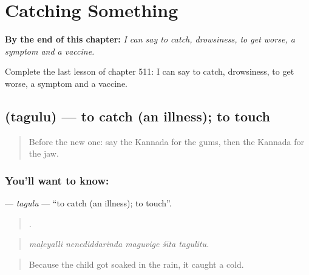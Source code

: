 
\chapter{Catching Something}
\label{ch:ka-catching-something}

\begin{chapteropening}
\textbf{By the end of this chapter:} \emph{I can say to catch, drowsiness, to get worse, a symptom and a vaccine.}

Complete the last lesson of chapter 511: I can say to catch, drowsiness, to get worse, a symptom and a vaccine.
\end{chapteropening}

\section[\texorpdfstring{\kn{ತಗುಲು} (tagulu)}{ತಗುಲು (tagulu)}]{ (tagulu) — to catch (an illness); to touch}

\label{lesson:KA-C511-tagulu}



\begin{quote}
Before the new one: say the Kannada for the gums, then the Kannada for the jaw.
\end{quote}

\subsection*{You'll want to know: }
\textbf{} — \emph{tagulu} — \textquotedblleft{}to catch (an illness); to touch\textquotedblright{}.

\begin{quote}
    .
\end{quote}

\begin{quote}
\emph{maḷeyalli nenediddarinda maguvige śīta tagulitu.}
\end{quote}

\begin{quote}
Because the child got soaked in the rain, it caught a cold.
\end{quote}

